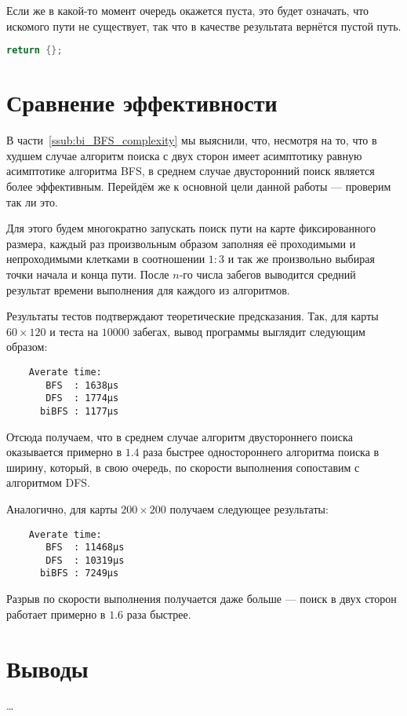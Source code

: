 \documentclass[a4paper, 12pt]{article}
\begin{document}
Если же в какой-то момент очередь окажется пуста, это  будет означать, что искомого пути не существует, так что в качестве результата вернётся пустой путь.
\begin{lstlisting}[language=C++]
    return {};
\end{lstlisting}

\section{Сравнение эффективности}
В части~\ref{ssub:bi_BFS_complexity} мы выяснили, что, несмотря на то, что в худшем случае алгоритм поиска с двух сторон имеет асимптотику равную асимптотике алгоритма BFS, в среднем случае двусторонний поиск является более эффективным. Перейдём же к основной цели данной работы --- проверим так ли это.

Для этого будем многократно запускать поиск пути на карте фиксированного размера, каждый раз произвольным образом заполняя её проходимыми и непроходимыми клетками в соотношении \({ 1 : 3 }\) и так же произвольно выбирая точки начала и конца пути. После \({ n }\)-го числа забегов выводится средний результат времени выполнения для каждого из алгоритмов.

Результаты тестов подтверждают теоретические предсказания. Так, для карты \({ 60 \times 120 }\) и теста на \({ 10000 }\) забегах, вывод программы выглядит следующим образом:
\begin{lstlisting}
    Averate time:
       BFS  : 1638µs
       DFS  : 1774µs
      biBFS : 1177µs
\end{lstlisting}
Отсюда получаем, что в среднем случае алгоритм двустороннего поиска оказывается примерно в \({ 1.4 }\) раза быстрее одностороннего алгоритма поиска в ширину, который, в свою очередь, по скорости выполнения сопоставим с алгоритмом DFS.

Аналогично, для карты \({ 200 \times 200 }\) получаем следующее результаты:
\begin{lstlisting}
    Averate time:
       BFS  : 11468µs
       DFS  : 10319µs
      biBFS : 7249µs
\end{lstlisting}
Разрыв по скорости выполнения получается даже больше --- поиск в двух сторон работает примерно в \({ 1.6 }\) раза быстрее.

\section{Выводы}
\ldots
\end{document}
